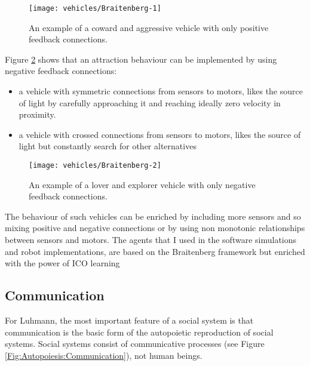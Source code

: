 \begin{figure}[htbp]
\begin{center}
\texttt{[image: vehicles/Braitenberg-1]}
\end{center}
\small{
\caption[Braitenberg vehicles positive feedback]{
An example of a coward and aggressive vehicle with only positive feedback connections.
\label{Fig:Braitenberg:Example1}}}
\end{figure}

Figure \ref{Fig:Braitenberg:Example2} shows that an attraction behaviour can be implemented
 by using negative feedback connections:
\begin{itemize}
 \item a vehicle with symmetric connections from sensors to motors, likes the source 
of light by carefully approaching it and reaching ideally zero velocity in proximity.
 \item a vehicle with crossed connections from sensors to motors, likes the source of light
but constantly search for other alternatives 
\end{itemize}

\begin{figure}[htbp]
\begin{center}
\texttt{[image: vehicles/Braitenberg-2]}
\end{center}
\small{
\caption[Braitenberg vehicles negative feedback]{
An example of a lover and explorer vehicle with only negative feedback connections.
\label{Fig:Braitenberg:Example2}}}
\end{figure}

The behaviour of such vehicles can be enriched by including more sensors and so
 mixing positive and negative connections or by using non monotonic relationships
 between sensors and motors.
The agents that I used in the software simulations and robot implementations, 
are based on the Braitenberg framework but enriched with the power of ICO learning 
\subsection{Communication}
For Luhmann, the most important feature of a social system is that communication
is the basic form of the autopoietic reproduction of social systems.
Social systems consist of communicative processes (see Figure
\ref{Fig:Autopoiesis:Communication}), not human beings.

